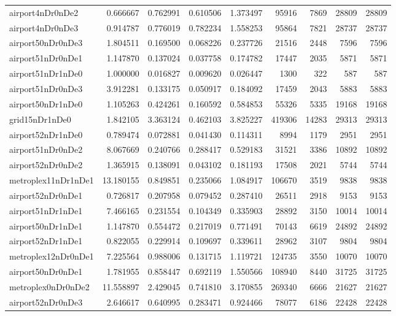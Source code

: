 \documentclass[../../../thesis.tex]{subfiles}
\begin{document}
\begin{longtable}{|l|r|r|r|r|r|r|r|r|}
airport4nDr0nDe2 & 0.666667 & 0.762991 & 0.610506 & 1.373497 & 95916 & 7869 & 28809 & 28809 \\
airport4nDr0nDe3 & 0.914787 & 0.776019 & 0.782234 & 1.558253 & 95864 & 7821 & 28737 & 28737 \\
airport50nDr0nDe3 & 1.804511 & 0.169500 & 0.068226 & 0.237726 & 21516 & 2448 & 7596 & 7596 \\
airport51nDr0nDe1 & 1.147870 & 0.137024 & 0.037758 & 0.174782 & 17447 & 2035 & 5871 & 5871 \\
airport51nDr1nDe0 & 1.000000 & 0.016827 & 0.009620 & 0.026447 & 1300 & 322 & 587 & 587 \\
airport51nDr0nDe3 & 3.912281 & 0.133175 & 0.050917 & 0.184092 & 17459 & 2043 & 5883 & 5883 \\
airport50nDr1nDe0 & 1.105263 & 0.424261 & 0.160592 & 0.584853 & 55326 & 5335 & 19168 & 19168 \\
grid15nDr1nDe0 & 1.842105 & 3.363124 & 0.462103 & 3.825227 & 419306 & 14283 & 29313 & 29313 \\
airport52nDr1nDe0 & 0.789474 & 0.072881 & 0.041430 & 0.114311 & 8994 & 1179 & 2951 & 2951 \\
airport51nDr0nDe2 & 8.067669 & 0.240766 & 0.288417 & 0.529183 & 31521 & 3386 & 10892 & 10892 \\
airport52nDr0nDe2 & 1.365915 & 0.138091 & 0.043102 & 0.181193 & 17508 & 2021 & 5744 & 5744 \\
metroplex11nDr1nDe1 & 13.180155 & 0.849851 & 0.235066 & 1.084917 & 106670 & 3519 & 9838 & 9838 \\
airport52nDr0nDe1 & 0.726817 & 0.207958 & 0.079452 & 0.287410 & 26511 & 2918 & 9153 & 9153 \\
airport51nDr1nDe1 & 7.466165 & 0.231554 & 0.104349 & 0.335903 & 28892 & 3150 & 10014 & 10014 \\
airport50nDr1nDe1 & 1.147870 & 0.554472 & 0.217019 & 0.771491 & 70143 & 6619 & 24892 & 24892 \\
airport52nDr1nDe1 & 0.822055 & 0.229914 & 0.109697 & 0.339611 & 28962 & 3107 & 9804 & 9804 \\
metroplex12nDr0nDe1 & 7.225564 & 0.988006 & 0.131715 & 1.119721 & 124735 & 3550 & 10070 & 10070 \\
airport50nDr0nDe1 & 1.781955 & 0.858447 & 0.692119 & 1.550566 & 108940 & 8440 & 31725 & 31725 \\
metroplex0nDr0nDe2 & 11.558897 & 2.429045 & 0.741810 & 3.170855 & 269340 & 6666 & 21627 & 21627 \\
airport52nDr0nDe3 & 2.646617 & 0.640995 & 0.283471 & 0.924466 & 78077 & 6186 & 22428 & 22428 \\

\end{longtable}
\end{document}
